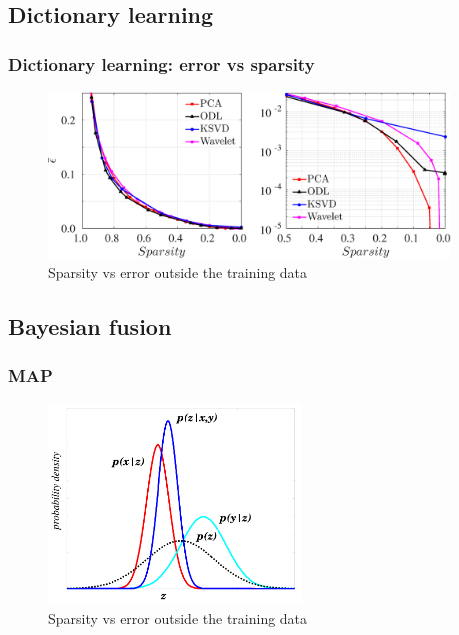 \documentclass{beamer}
\begin{document}
\subsection{Dictionary learning}
\begin{frame}
	\frametitle{Dictionary learning: error vs sparsity} 
	\begin{figure}
	\centering
		\includegraphics[width=0.95\textwidth]{./figures/DL/Sparsity_vs_NRMSE_PCA_ODL_KSVD_WL_Dau_patchsize04.eps}
		\caption{Sparsity vs error outside the training data}
	\end{figure}
\end{frame}

\subsection{Bayesian fusion}
\begin{frame}
	\frametitle{MAP} 
	\begin{figure}
	\centering
		\includegraphics[width=0.6\textwidth]{./figures/Bayes/MAP.png}
		\caption{Sparsity vs error outside the training data}
	\end{figure}
\end{frame}
\end{document}
